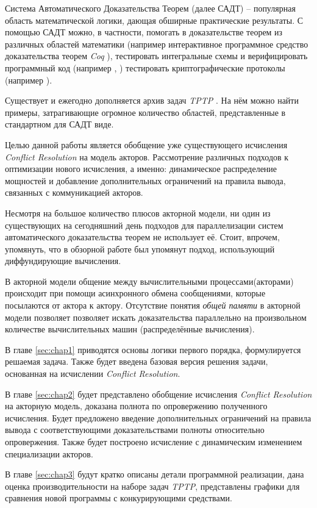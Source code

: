 \startprefacepage

Система Автоматического Доказательства Теорем (далее САДТ) -- популярная область математической логики, дающая обширные практические результаты. С помощью САДТ можно, в частности, помогать в доказательстве теорем из различных областей математики (например интерактивное программное средство доказательства теорем \emph{Coq} \cite{09thecoq}), тестировать интегральные схемы и верифицировать программный код (например \cite{Detlefs:2005:STP:1066100.1066102}, \cite{zap-automated-theorem-proving-for-software-analysis}) тестировать криптографические протоколы (например \cite{DBLP:journals/corr/MoranW17}).


Существует и ежегодно дополняется архив задач \emph{TPTP} \cite{Sutcliffe2009}. На нём можно найти примеры, затрагивающие огромное количество областей, представленные в стандартном для САДТ виде.


Целью данной работы является обобщение уже существующего исчисления \emph{Conflict Resolution} \cite{DBLP:journals/corr/SlaneyP16} на модель акторов. Рассмотрение различных подходов к оптимизации нового исчисления, а именно: динамическое распределение мощностей и добавление дополнительных ограничений на правила вывода, связанных с коммуникацией акторов.


Несмотря на большое количество плюсов акторной модели, ни один из существующих на сегодняшний день подходов для параллелизации систем автоматического доказательства теорем не использует её. Стоит, впрочем, упомянуть, что в обзорной работе \cite{Bonacina2018} был упомянут подход, использующий диффундирующие вычисления. 

В акторной модели общение между вычислительными процессами(акторами) происходит при помощи асинхронного обмена сообщениями, которые посылаются от актора к актору. Отсутствие понятия \emph{общей памяти} в акторной модели позволяет позволяет искать доказательства параллельно на произвольном количестве вычислительных машин (распределённые вычисления).


В главе \ref{sec:chap1} приводятся основы логики первого порядка, формулируется решаемая задача. Также будет введена базовая версия решения задачи, основанная на исчислении \emph{Conflict Resolution}. 


В главе \ref{sec:chap2} будет представлено обобщение исчисления \emph{Conflict Resolution} на акторную модель, доказана полнота по опровержению полученного исчисления. Будет предложено введение дополнительных ограничений на правила вывода с соответствующими доказательствами полноты относительно опровержения. Также будет построено исчисление с динамическим изменением специализации акторов.

В главе \ref{sec:chap3} будут кратко описаны детали программной реализации, дана оценка производительности на наборе задач \emph{TPTP}, представлены графики для сравнения новой программы с конкурирующими средствами.